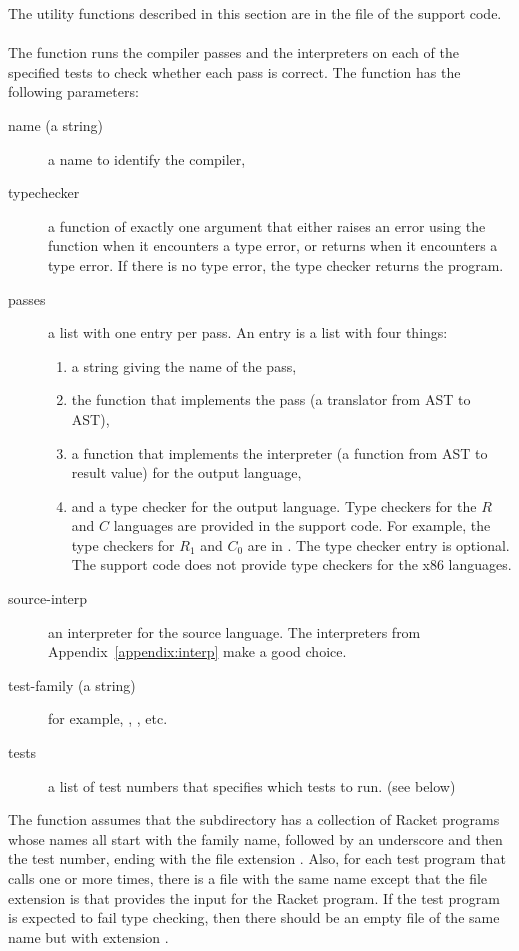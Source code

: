 \documentclass[11pt]{book}
\begin{document}
The utility functions described in this section are in the
 file of the support code.

\paragraph{}

The  function runs the compiler passes and the
interpreters on each of the specified tests to check whether each pass
is correct. The  function has the following
parameters:
\begin{description}
\item[name (a string)] a name to identify the compiler,
\item[typechecker] a function of exactly one argument that either
  raises an error using the  function when it encounters a
  type error, or returns  when it encounters a type
  error. If there is no type error, the type checker returns the
  program.

\item[passes] a list with one entry per pass.  An entry is a list with
  four things:
  \begin{enumerate}
  \item a string giving the name of the pass,
  \item the function that implements the pass (a translator from AST
    to AST),
  \item a function that implements the interpreter (a function from
    AST to result value) for the output language,
  \item and a type checker for the output language.  Type checkers for
    the $R$ and $C$ languages are provided in the support code.  For
    example, the type checkers for $R_1$ and $C_0$ are in
    . The type checker entry is optional.  The
    support code does not provide type checkers for the x86 languages.
  \end{enumerate}

\item[source-interp] an interpreter for the source language. The
  interpreters from Appendix~\ref{appendix:interp} make a good choice.
  
\item[test-family (a string)] for example, , , etc.
\item[tests] a list of test numbers that specifies which tests to
  run. (see below)
\end{description}
%
The  function assumes that the subdirectory
 has a collection of Racket programs whose names all start
with the family name, followed by an underscore and then the test
number, ending with the file extension . Also, for each test
program that calls  one or more times, there is a file with
the same name except that the file extension is  that
provides the input for the Racket program. If the test program is
expected to fail type checking, then there should be an empty file of
the same name but with extension .
\end{document}
